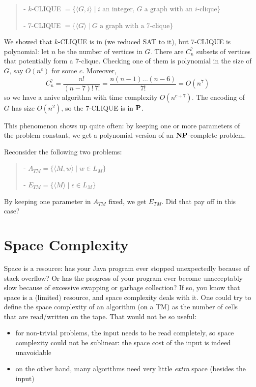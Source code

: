 \begin{verse}
- $k$-CLIQUE $= \{\langle G,i \rangle\mid \text{$i$ an integer, $G$ a graph with an $i$-clique}\}$

- 7-CLIQUE $= \{\langle G \rangle\mid \text{$G$ a graph with a 7-clique}\}$
\end{verse}

We showed that $k$-CLIQUE is in \NPC (we reduced SAT to it), but
7-CLIQUE is polynomial: let $n$ be the number of vertices in $G$. There
are $C_n^7$ subsets of vertices that potentially form a
7-clique. Checking one of them is polynomial in the size of $G$, say
$O(n^c)$ for some $c$. Moreover,
\begin{equation*}
	C_n^7 = \frac{n!}{(n-7)!\, 7!} = \frac{n(n-1)\hdots(n-6)}{7!} = O(n^7)
\end{equation*}
so we have a naive
algorithm with time complexity $O(n^{c+7})$. The encoding of $G$ has
size $O(n^2)$, so the 7-CLIQUE is in $\P$.

This phenomenon shows up quite often: by keeping one or more
parameters of the problem constant, we get a polynomial version of an
$\NP$-complete problem.

Reconsider the following two problems:

\begin{verse}
- $A_{TM} = \{\langle M,w \rangle \mid w \in L_M\}$

- $E_{TM} = \{\langle M \rangle \mid \epsilon \in L_M\}$
\end{verse}

By keeping one parameter in $A_{TM}$ fixed, we get $E_{TM}$. Did that
pay off in this case?



\section{Space Complexity}

Space is a resource: has your Java program ever stopped unexpectedly
because of stack overflow? Or has the progress of your program ever
become unacceptably slow because of excessive swapping or garbage
collection? If so, you know that space is a (limited) resource, and
space complexity deals with it. One could try to define the space
complexity of an algorithm (on a TM) as the number of cells that are
read/written on the tape. That would not be so useful:
\begin{itemize}
\item for non-trivial problems, the input needs to be read completely, so
space complexity could not be sublinear: the space cost of the input
is indeed unavoidable

\item on the other hand, many algorithms need very little {\em
extra} space (besides the input)
\end{itemize}


